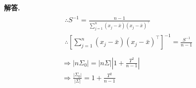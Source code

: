 \documentclass[12pt, a4paper, oneside]{ctexart}
\newenvironment{solution}{\par\noindent\textbf{解答. }}{\par}
\begin{document}
\begin{solution}
\[\begin{gathered}
{\begin{gathered}
                \therefore S^{-1} = \frac{n-1}{\sum_{j=1}^{n}(x_j-\bar{x})(x_j-\bar{x})^\top}\\
                \therefore \left[ {\sum_{j=1}^{n}(x_j-\bar{x})(x_j-\bar{x})^\top} \right]^{-1} = \frac{S^{-1}}{n-1}\\
                \end{gathered}
            }\\
            \Rightarrow \left| n\Sigma_0 \right| = \left| n\Sigma \right| \left| 1+\frac{T^{2}}{n-1} \right|\\
            \Rightarrow  \frac{|\Sigma_0|}{|\Sigma|}=1+\frac{T^{2}}{n-1}
        \end{gathered}
    \]
\end{solution}
\end{document}
